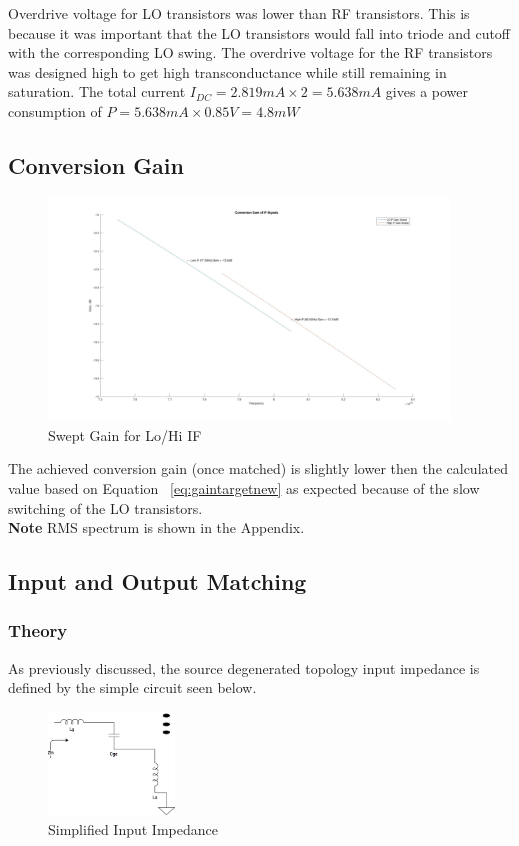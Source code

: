 \documentclass{article}                                                         %
\begin{document}
Overdrive voltage for LO transistors was lower than RF transistors. This is because it was important
that the LO transistors would fall into triode and cutoff with the corresponding LO swing. The overdrive
voltage for the RF transistors was designed high to get high transconductance while still remaining in saturation.
The total current $I_{DC} = 2.819mA \times 2 = 5.638mA$ gives a power consumption of $P = 5.638mA \times 0.85V = 4.8mW$


\subsection{Conversion Gain}
\begin{figure}[H]
  \centering
  \includegraphics[width=0.95\textwidth] {Plots/Gain.jpg}
  \caption{Swept Gain for Lo/Hi IF}
    \label{fig:matgain}
\end{figure}
The achieved conversion gain (once matched) is slightly lower then the calculated value based on Equation
~\ref{eq:gaintargetnew} as expected because of the slow switching of the LO transistors.\\
\textbf{Note} RMS spectrum is shown in the Appendix.
\subsection{Input and Output Matching}\label{sec:matching}
\subsubsection{Theory}
As previously discussed, the source degenerated topology input impedance is defined by the
simple circuit seen below.

\begin{figure}[H]
  \centering
  \includegraphics[width=0.3\textwidth] {Figures/zin}
  \caption{Simplified Input Impedance}
    \label{fig:zinSimple}
\end{figure}
\end{document}
